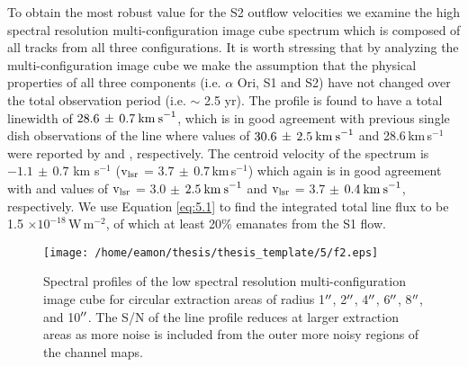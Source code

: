 To obtain the most robust value for the S2 outflow velocities we examine the high spectral resolution multi-configuration image cube spectrum which is composed of all tracks from all three configurations. It is worth stressing that by analyzing the multi-configuration image cube we make the assumption that the physical properties of all three components (i.e. $\alpha$ Ori, S1 and S2) have not changed over the total observation period (i.e. $\sim$ 2.5 yr). The profile is found to have a total linewidth of $28.6\,\pm \,0.7\>{\rm km\>s}^{-1}$, which is in good agreement with previous single dish observations of the line where values of $30.6\,\pm \,2.5\>{\rm km\>s}^{-1}$ and  28.6\,km\,s$^{-1}$ were reported by \cite{knapp_1980} and \cite{huggins_1987}, respectively. The centroid velocity of the spectrum is  $-1.1\,\pm\,0.7$ km s$^{-1}$ ($\rm{v_{\rm{lsr}}}$ = $3.7\,\pm \,0.7$\,km\,s$^{-1}$) which again is in good agreement with \cite{knapp_1980} and \cite{huggins_1987} values of $\rm{v_{lsr}}$ = 3.0 $\pm$ $2.5\>{\rm km\>s}^{-1}$ and $\rm{v_{lsr}}$ = 3.7 $\pm$ $0.4\>{\rm km\>s}^{-1}$, respectively. We use Equation \ref{eq:5.1} to find the integrated total line flux to be 1.5 $\times 10^{-18}$\,W\,m$^{-2}$, of which at least 20\% emanates from the S1 flow.

\begin{figure}[!ht]
\centering 
\texttt{[image: /home/eamon/thesis/thesis\_template/5/f2.eps]}
\caption[Spectra extracted over various regions]{Spectral profiles of the low spectral resolution multi-configuration image cube for circular extraction areas of radius 1$^{\prime\prime}$, 2$^{\prime\prime}$, 4$^{\prime\prime}$, 6$^{\prime\prime}$, 8$^{\prime\prime}$, and 10$^{\prime\prime}$. The S/N of the line profile reduces at larger extraction areas as more noise is included from the outer more noisy regions of the channel maps.}
\label{fig:5.5}
\end{figure}

